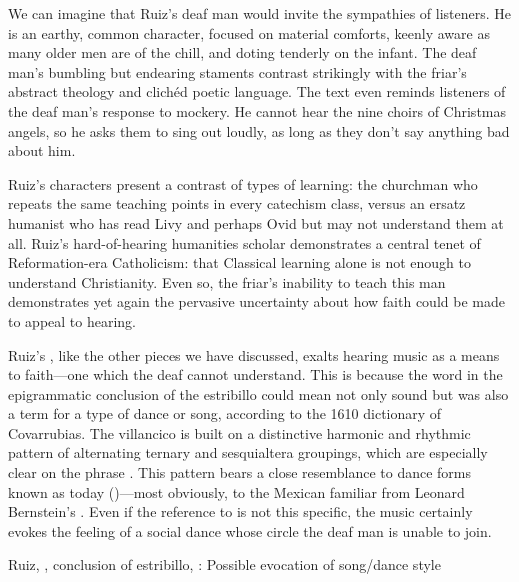 We can imagine that Ruiz's deaf man would invite the sympathies of listeners.
He is an earthy, common character, focused on material comforts, keenly aware as many older men are of the chill, and doting tenderly on the infant.
The deaf man's bumbling but endearing staments contrast strikingly with the friar's abstract theology and clichéd poetic language.
The text even reminds listeners of the deaf man's response to mockery.
He cannot hear the nine choirs of Christmas angels, so he asks them to sing out loudly, as long as they don't say anything bad about him.

Ruiz's characters present a contrast of types of learning: the churchman who repeats the same teaching points in every catechism class, versus an ersatz humanist who has read Livy and perhaps Ovid but may not understand them at all.
Ruiz's hard-of-hearing humanities scholar demonstrates a central tenet of Reformation-era Catholicism: that Classical learning alone is not enough to understand Christianity.
Even so, the friar's inability to teach this man demonstrates yet again the pervasive uncertainty about how faith could be made to appeal to hearing.

Ruiz's , like the other pieces we have discussed, exalts hearing music as a means to faith---one which the deaf cannot understand.
This is because the word  in the epigrammatic conclusion of the estribillo could mean not only sound but was also a term for a type of dance or song, according to the 1610 dictionary of Covarrubias.
The villancico is built on a distinctive harmonic and rhythmic pattern of alternating ternary and sesquialtera groupings, which are especially clear on the phrase .
This pattern bears a close resemblance to dance forms known as  today ()---most obviously, to the Mexican  familiar from Leonard Bernstein's .
Even if the reference to  is not this specific, the music certainly evokes the feeling of a social dance whose circle the deaf man is unable to join.


\begin{exmusic}
  \caption{Ruiz, , conclusion of estribillo, : Possible evocation of  song/dance style}
  \label{exmusic:Ruiz-Sordos-son}
\end{exmusic}


